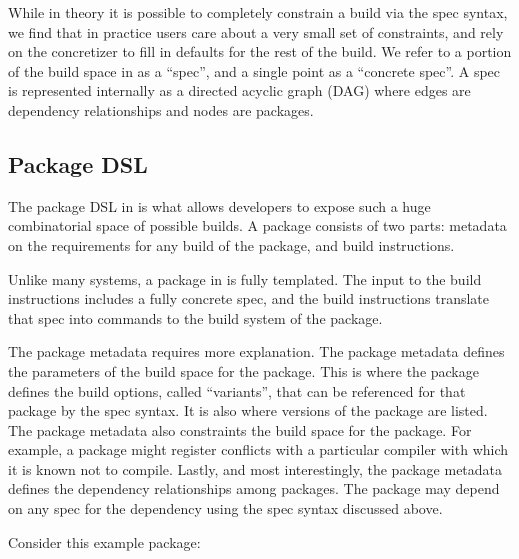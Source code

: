 While in theory it is possible to completely constrain a build via the spec syntax, we find that in practice users care about a very small set of constraints, and rely on the concretizer to fill in defaults for the rest of the build. We refer to a portion of the build space in \spack{} as a ``spec'', and a single point as a ``concrete spec''. A spec is represented internally as a directed acyclic graph (DAG) where edges are dependency relationships and nodes are packages.

\subsection{Package DSL}
\label{subsec:pack-dsl}

The package DSL in \spack{} is what allows developers to expose such a huge combinatorial space of possible builds. A \spack{} package consists of two parts: metadata on the requirements for any build of the package, and build instructions.

Unlike many systems, a package in \spack{} is fully templated. The input to the build instructions includes a fully concrete spec, and the build instructions translate that spec into commands to the build system of the package.

The package metadata requires more explanation. The package metadata defines the parameters of the build space for the package. This is where the package defines the build options, called ``variants'', that can be referenced for that package by the spec syntax. It is also where versions of the package are listed. The package metadata also constraints the build space for the package. For example, a package might register conflicts with a particular compiler with which it is known not to compile. Lastly, and most interestingly, the package metadata defines the dependency relationships among packages. The package may depend on any spec for the dependency using the spec syntax discussed above.

Consider this example package:

